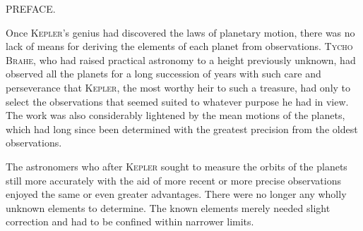 \clearpage
{}
\begin{center}\Large PREFACE.\end{center}
\medskip
{}Once \textsc{Kepler}'s genius had discovered the laws of planetary motion, there was no lack of means for deriving the elements of each planet from observations. \textsc{Tycho Brahe}, who had raised practical astronomy to a height previously unknown, had observed all the planets for a long succession of years with such care and perseverance that \textsc{Kepler}, the most worthy heir to such a treasure, had only to select the observations that seemed suited to whatever purpose he had in view. The work was also considerably lightened by the mean motions of the planets, which had long since been determined with the greatest precision from the oldest observations.

The astronomers who after \textsc{Kepler} sought to measure the orbits of the planets still more accurately with the aid of more recent or more precise observations enjoyed the same or even greater advantages. There were no longer any wholly unknown elements to determine. The known elements merely needed slight correction and had to be confined within narrower limits.

